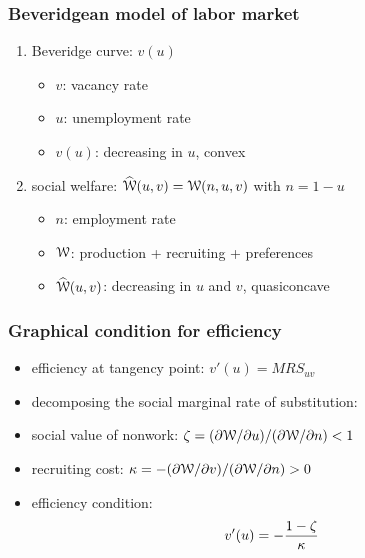 \documentclass[12pt,xcolor={dvipsnames},hyperref={pdftex,pdfpagemode=UseNone,hidelinks,pdfdisplaydoctitle=true},usepdftitle=false]{beamer}
\def\W{\wh{\Wc}}
\begin{document}
\begin{frame}
\frametitle{Beveridgean model of labor market}
\begin{enumerate}
\item Beveridge curve: $v(u)$
\begin{itemize}
\item $v$: vacancy rate
\item $u$: unemployment rate
\item $v(u)$: decreasing in $u$, convex
\end{itemize}
\item social welfare: $\W(u,v) = \Wc(n,u,v)$ with $n=1-u$
\begin{itemize}
\item $n$: employment rate
\item $\mathcal{W}$: production + recruiting + preferences
\item $\W(u,v)$: decreasing in $u$ and $v$, quasiconcave  
\end{itemize}
\end{enumerate}
\end{frame}

\begin{frame}
\frametitle{Graphical condition for efficiency}
\begin{itemize}
\item efficiency at tangency point: $v'(u) = MRS_{uv}$
\item decomposing the social marginal rate of substitution:
\only<1>{\begin{equation*}
MRS_{uv} = -\frac{\pdx{\W}{u}}{\pdx{\W}{v}}
\end{equation*}}%
%
%
\item<4> social value of nonwork: $\zeta = (\partial \mathcal{W}/\partial u)/(\partial \mathcal{W}/\partial n)<1$
\item<4> recruiting cost: $\kappa = - (\partial \mathcal{W}/\partial v)/(\partial \mathcal{W}/\partial n) > 0$
\item<4> efficiency condition:
\begin{equation*}
v'(u)  = - \frac{1 - \zeta}{\kappa} 
\end{equation*}
\end{itemize}
\end{frame}
\end{document}
